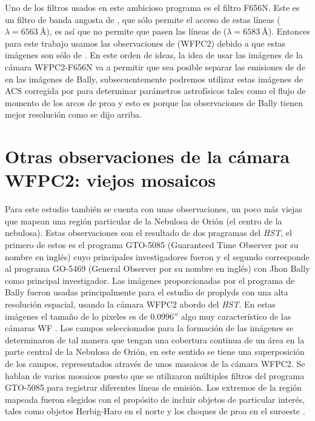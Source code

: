 Uno de los filtros usados en este ambicioso programa es el filtro F656N. Este es un filtro de banda angosta de \ha{}, que sólo permite el acceso de estas líneas (\ha{}~\(\lambda = 6563~\text{\AA{}}\)), es así que no permite que pasen las líneas de \nii{} (\(\lambda = 6583~\text{\AA{}}\)). Entonces para este trabajo usamos las observaciones de \citet{Robberto:2013a} (WFPC2) debido a que estas imágenes son sólo de \ha{}. En este orden de ideas, la idea de usar las imágenes de la cámara WFPC2-F656N va a permitir que sea posible separar las emisiones de \ha{} de \nii{} en las imágenes de Bally, subsecuentemente  podremos  utilizar estas imágenes de ACS corregida por \nii{} para determinar parámetros astrofísicos tales como el flujo de momento de los arcos de proa y esto es  porque las observaciones de Bally tienen mejor resolución como se dijo arriba.

\section{Otras observaciones de la cámara WFPC2:  viejos mosaicos}
\label{sec:mosaic}

Para este estudio también se cuenta con unas observaciones, un poco más viejas que mapean una región particular de la Nebulosa de Orión (el centro de la nebulosa). Estas observaciones son el resultado de dos pragramas del \textit{HST}, el primero de estos es el programa GTO-5085 (Guaranteed Time Observer  por su nombre en inglés) cuyo principales investigadores fueron  \citet{Odell:1996} y el segundo corresponde al programa GO-5469 (General Observer por su nombre en inglés) con Jhon Bally como principal investigador. Las imágenes proporcionadas por el programa de Bally fueron usadas principalmente para el estudio de proplyds con una  alta resolución espacial, usando la cámara WFPC2 abordo del \textit{HST}. En estas imágenes el tamaño de lo pixeles es de \(0.0996''\) algo muy característico de las cámaras WF \citep{Holtzman:1995}. Los campos seleccionados para la formación de las imágenes se determinaron de tal manera que tengan una cobertura continua de un área en la parte central de la Nebulosa de Orión, en este sentido se tiene una superposición de los campos, representados através de unos  masaicos de la cámara WFPC2. Se hablan de varios mosaicos puesto que se utilizaron múltiples filtros del programa GTO-5085 para registrar diferentes líneas de emisión. Los extremos de la región mapeada fueron elegidos con el propósito de incluir objetos de particular interés, tales como objetos Herbig-Haro en el norte y los choques de proa en el suroeste \citep{Odell:1996}.\\

